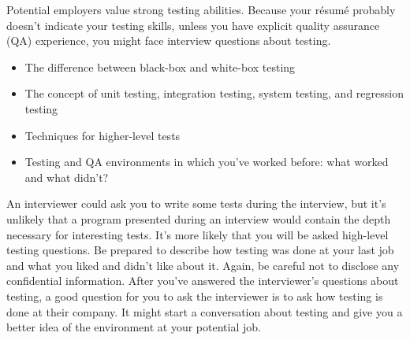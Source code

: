 
Potential employers value strong testing abilities. Because your résumé probably doesn’t indicate your testing skills, unless you have explicit quality assurance (QA) experience, you might face interview questions about testing.


\begin{itemize}
\item
The difference between black-box and white-box testing

\item
The concept of unit testing, integration testing, system testing, and regression testing

\item
Techniques for higher-level tests

\item
Testing and QA environments in which you’ve worked before: what worked and what didn’t?
\end{itemize}


An interviewer could ask you to write some tests during the interview, but it’s unlikely that a program presented during an interview would contain the depth necessary for interesting tests. It’s more likely that you will be asked high-level testing questions. Be prepared to describe how testing was done at your last job and what you liked and didn’t like about it. Again, be careful not to disclose any confidential information. After you’ve answered the interviewer’s questions about testing, a good question for you to ask the interviewer is to ask how testing is done at their company. It might start a conversation about testing and give you a better idea of the environment at your potential job.


